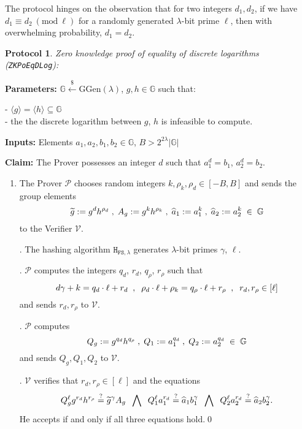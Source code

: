 \documentclass[11pt, lettersize, notitlepage, leqno, footskip=0.6cm]{article}
\newcommand{\ttt}{\texttt}
\newcommand{\bG}{\mathbb{G}}
\newcommand{\la}{\langle}
\newcommand{\ra}{\rangle}
\newcommand{\wti}{\widetilde}
\newcommand{\mc}{\mathcal}
\newcommand{\mb}{\mathbb}
\newcommand{\mr}{\mathrm}
\newcommand{\lam}{\lambda}
\newcommand{\lamb}{\lambda}
\newcommand{\what}{\widehat}
\newcommand{\sub}{\subseteq}
\newcommand{\mP}{\mc{P}}
\newcommand{\V}{\mc{V}}
\newcommand{\vs}{\vspace{-0.15cm}}
\newcommand{\noin}{\noindent}
\newcommand{\op}{overwhelming probability}
\newcommand{\sta}{\stackrel{?}{=}}
\newcommand{\Mod}[1]{\ (\mathrm{mod}\ #1)}
\newtheorem{Prot}[Thm]{Protocol}
\numberwithin{equation}{section}
\begin{document}
\noin The protocol hinges on the observation that for two integers $d_1,d_2$, if we have $d_1\equiv d_2\Mod{\ell}$ for a randomly generated $\lam$-bit prime $\ell$, then with \op, $d_1= d_2$.

\vspace{0.15cm}

\begin{Prot} \normalfont \hypertarget{EqDLog}{\textit{Zero knowledge proof of equality of discrete logarithms}} (\verb|ZKPoEqDLog|):\end{Prot} \vspace{-0.3cm}

\noin \textbf{Parameters:} $\mb{G}\xleftarrow{\$} \mr{GGen}(\lamb)$,  $g,h\in \mb{G}$ such that:

\noin - $\la g \ra = \la h \ra\sub \bG$ \\
\noin - the the discrete logarithm between $g$, $h$ is infeasible to compute.

\noin \textbf{Inputs:} Elements $a_1, a_2, b_1, b_2 \in \mb{G}$, $B > 2^{2\lam}|\bG|$

\noin \textbf{Claim:} The Prover possesses an integer $d$ such that $a_1^{d} = b_1$, $a_2^{d} = b_2$.

\begin{enumerate}[wide, labelwidth=!, labelindent=0pt]\vs \item The Prover $\mP$ chooses random integers $k, \rho_k, \rho_d\in [-B, B] $ and sends the group elements \vs $$\wti{g}:= g^d h^{\rho_d}\;,\; A_g:= g^k h^{\rho_k}\;,\; \what{a}_1:= a_1^{k}\;,\; \what{a}_2:= a_2^k \;\in\;\bG \vs $$ to the Verifier $\V$.

\noin 2. The hashing algorithm $\ttt{H}_{\ttt{FS},\lam}$ generates $\lam$-bit primes $\gamma$, $\ell$.

\noin 3. $\mP$ computes the integers $q_d$, $r_d$, $q_{\rho}$, $r_{\rho}$ such that \vs $$ d\gamma+k = q_d\cdot\ell+r_d\;\;,\;\;\rho_d\cdot \ell + \rho_k = q_{\rho}\cdot \ell + r_{\rho}\;\;,\;\; r_d,r_{\rho}\in[\ell]\vs $$ and sends $r_d,r_{\rho}$ to $\V$.

\noin 4. $\mP$ computes $$Q_g:= g^{q_{d}}h^{q_{\rho}}\;,\; Q_1:= a_1^{q_d}\;,\; Q_2:= a_2^{q_d}\;\in\;\bG \vs $$ and sends $Q_g, Q_1,Q_2$ to $\V$.

\noin 5. $\V$ verifies that $r_d,r_{\rho}\in [\ell]$ and the equations \vs $$Q_g^{\ell}g^{r_d}h^{r_{\rho}}  \sta \wti{g}^{\gamma}A_g\;\;\bigwedge\;\; Q_1^{\ell}a_1^{r_d}\sta \what{a}_1b_1^{\gamma}\;\;\bigwedge\;\; Q_2^{\ell}a_2^{r_d}\sta \what{a}_2b_2^{\gamma}. \vs $$ He accepts if and only if all three equations hold.\qed \end{enumerate}
\end{document}
